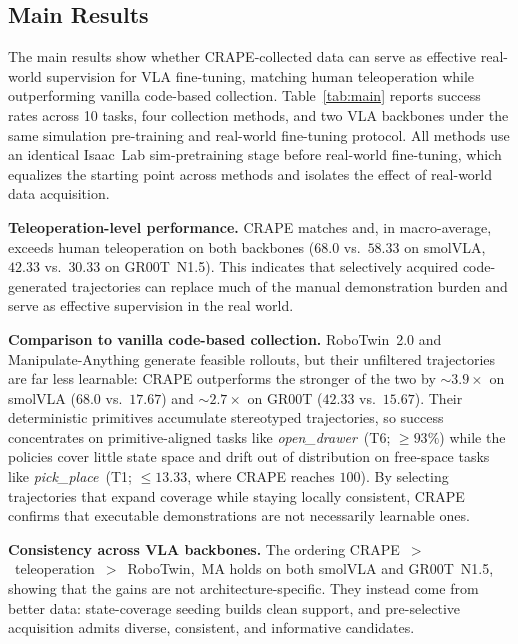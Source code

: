 \documentclass{article}
\begin{document}
\subsection{Main Results}
\label{sec:exp_main}

The main results show whether CRAPE-collected data can serve as effective real-world supervision for VLA fine-tuning, matching human teleoperation while outperforming vanilla code-based collection.
Table~\ref{tab:main} reports success rates across 10 tasks, four collection methods, and two VLA backbones under the same simulation pre-training and real-world fine-tuning protocol.
All methods use an identical Isaac~Lab sim-pretraining stage before real-world fine-tuning, which equalizes the starting point across methods and isolates the effect of real-world data acquisition.

\textbf{Teleoperation-level performance.}
CRAPE matches and, in macro-average, exceeds human teleoperation on both backbones ($68.0$ vs.\ $58.33$ on smolVLA, $42.33$ vs.\ $30.33$ on GR00T~N1.5).
This indicates that selectively acquired code-generated trajectories can replace much of the manual demonstration burden and serve as effective supervision in the real world.

\textbf{Comparison to vanilla code-based collection.}
RoboTwin~2.0 and Manipulate-Anything generate feasible rollouts, but their unfiltered trajectories are far less learnable: CRAPE outperforms the stronger of the two by $\sim\!3.9\times$ on smolVLA ($68.0$ vs.\ $17.67$) and $\sim\!2.7\times$ on GR00T ($42.33$ vs.\ $15.67$).
Their deterministic primitives accumulate stereotyped trajectories, so success concentrates on primitive-aligned tasks like \textit{open\_drawer}~(T6; $\ge\!93\%$) while the policies cover little state space and drift out of distribution on free-space tasks like \textit{pick\_place}~(T1; $\le\!13.33$, where CRAPE reaches $100$).
By selecting trajectories that expand coverage while staying locally consistent, CRAPE confirms that executable demonstrations are not necessarily learnable ones.

\textbf{Consistency across VLA backbones.}
The ordering CRAPE~$>$~teleoperation~$>$~{RoboTwin,~MA} holds on both smolVLA and GR00T~N1.5, showing that the gains are not architecture-specific.
They instead come from better data: state-coverage seeding builds clean support, and pre-selective acquisition admits diverse, consistent, and informative candidates.
\end{document}
